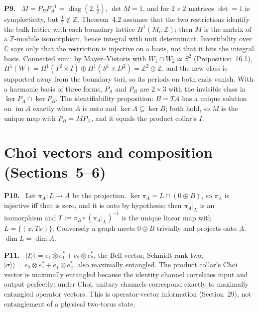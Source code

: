 \documentclass[11pt]{article}
\newcommand{\Z}{\mathbb{Z}}
\newcommand{\C}{\mathbb{C}}
\newenvironment{solution}[1]{\medskip\noindent\textbf{P#1.}\ }{\par\medskip}
\begin{document}
\begin{solution}{9}
$M = P_BP_A^{-1} = \operatorname{diag}(2,\tfrac12)$, $\det M = 1$, and for $2\times2$
matrices $\det = 1$ is symplecticity, but $\tfrac12\notin\Z$. Theorem~4.2 assumes
that the two restrictions identify the bulk lattice with each boundary lattice
$H^1(M_i;\Z)$; then $M$ is the matrix of a $\Z$-module isomorphism, hence
integral with unit determinant. Invertibility over $\C$ says only that the
restriction is injective on a basis, not that it hits the integral basis.
Connected sum: by Mayer--Vietoris with $W_1\cap W_2\simeq S^2$ (Proposition~16.1),
$H^1(W) = H^1(T^2\times I)\oplus H^1(S^1\times D^2) = \Z^2\oplus\Z$, and the new
class is supported away from the boundary tori, so its periods on both ends
vanish. With a harmonic basis of three forms, $P_A$ and $P_B$ are $2\times3$ with
the invisible class in $\ker P_A\cap\ker P_B$. The identifiability proposition:
$B = TA$ has a unique solution on $\operatorname{im}A$ exactly when $A$ is onto
and $\ker A\subseteq\ker B$; both hold, so $M$ is the unique map with
$P_B = MP_A$, and it equals the product collar's $I$.
\end{solution}

\section*{Choi vectors and composition (Sections~5--6)}

\begin{solution}{10}
Let $\pi_A:L\to A$ be the projection. $\ker\pi_A = L\cap(0\oplus B)$, so $\pi_A$
is injective iff that is zero, and it is onto by hypothesis; then $\pi_A|_L$ is
an isomorphism and $T := \pi_B\circ(\pi_A|_L)^{-1}$ is the unique linear map
with $L = \{(x,Tx)\}$. Conversely a graph meets $0\oplus B$ trivially and
projects onto $A$. $\dim L = \dim A$.
\end{solution}

\begin{solution}{11}
$|I\rangle\!\rangle = e_1\otimes e_1^* + e_2\otimes e_2^*$, the Bell vector, Schmidt rank
two; $|\sigma\rangle\!\rangle = e_2\otimes e_1^* + e_1\otimes e_2^*$, also maximally
entangled. The product collar's Choi vector is maximally entangled because the
identity channel correlates input and output perfectly: under Choi, unitary
channels correspond exactly to maximally entangled operator vectors. This is
operator-vector information (Section~29), not entanglement of a physical
two-torus state.
\end{solution}
\end{document}
